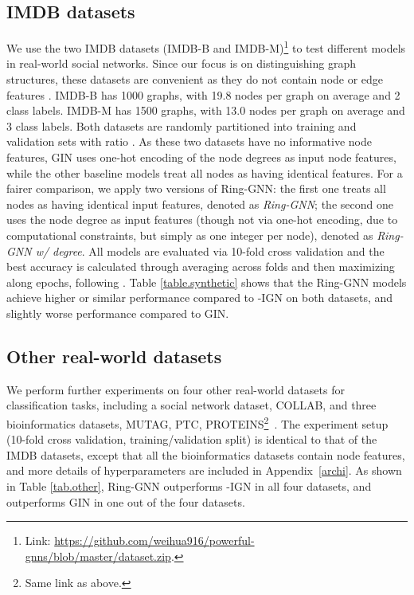 \documentclass{article}
\begin{document}
\subsection{IMDB datasets} \label{sec.imbdb}
We use the two IMDB datasets (IMDB-B and IMDB-M)\footnote{Link: \url{https://github.com/weihua916/powerful-gnns/blob/master/dataset.zip}.} to test different models in real-world social networks. Since our focus is on distinguishing graph structures, these datasets are convenient as they do not contain node or edge features \cite{yanardag2015deep}.
IMDB-B has 1000 graphs, with 19.8 nodes per graph on average and 2 class labels. IMDB-M has 1500 graphs, with 13.0 nodes per graph on average and 3 class labels. 
Both datasets are randomly partitioned into training and validation sets with ratio . 
As these two datasets have no informative node features, GIN uses one-hot encoding of the node degrees as input node features, while the other baseline models treat all nodes as having identical features. For a fairer comparison, we apply two versions of Ring-GNN: the first one treats all nodes as having identical input features, denoted as \emph{Ring-GNN}; the second one uses the node degree as input features (though not via one-hot encoding, due to computational constraints, but simply as one integer per node), denoted as \emph{Ring-GNN w/ degree}. All models are evaluated via 10-fold cross validation and the best accuracy is calculated through averaging across folds and then maximizing along epochs, following \cite{xu2018powerful}. Table \ref{table.synthetic} shows that the Ring-GNN models achieve higher or similar performance compared to -IGN on both datasets, and slightly worse performance compared to GIN. 

\subsection{Other real-world datasets}
We perform further experiments on four other real-world datasets for classification tasks, including a social network dataset, COLLAB, and three bioinformatics datasets, MUTAG, PTC, PROTEINS\footnote{Same link as above.}~\cite{yanardag2015deep}. The experiment setup (10-fold cross validation, training/validation split) is identical to that of the IMDB datasets, except that all the bioinformatics datasets contain node features, and more details of hyperparameters are included in Appendix~\ref{archi}. As shown in Table \ref{tab.other}, Ring-GNN outperforms -IGN in all four datasets, and outperforms GIN in one out of the four datasets. 
\end{document}
